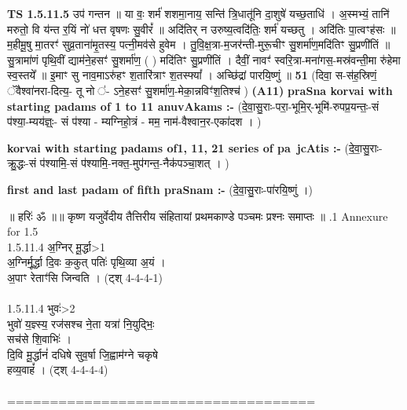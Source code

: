 \documentclass[17pt]{extarticle}
\begin{document}
                  \newline
                                \textbf{ TS 1.5.11.5} \newline
                  उप॑ गन्तन ॥ या वः॒ शर्म॑ शशमा॒नाय॒ सन्ति॑ त्रि॒धातू॑नि दा॒शुषे॑ यच्छ॒ताधि॑ । अ॒स्मभ्यं॒ तानि॑ मरुतो॒ वि य॑न्त र॒यिं नो॑ धत्त वृषणः सु॒वीरं᳚ ॥ अदि॑तिर् न उरुष्य॒त्वदि॑तिः॒ शर्म॑ यच्छतु । अदि॑तिः पा॒त्वꣳह॑सः ॥ म॒हीमू॒षु मा॒तरꣳ॑ सुव्र॒ताना॑मृ॒तस्य॒ पत्नी॒मव॑से हुवेम । तु॒वि॒क्ष॒त्रा-म॒जर॑न्ती-मुरू॒चीꣳ सु॒शर्मा॑ण॒मदि॑तिꣳ सु॒प्रणी॑तिं ॥ सु॒त्रामा॑णं पृथि॒वीं द्याम॑ने॒हसꣳ॑ सु॒शर्मा॑ण॒ ( ) मदि॑तिꣳ सु॒प्रणी॑तिं । दैवीं॒ नावꣳ॑ स्वरि॒त्रा-मना॑गस॒-मस्र॑वन्ती॒मा रु॑हेमा स्व॒स्तये᳚ ॥ इ॒माꣳ सु नाव॒माऽरु॑हꣳ श॒तारि॑त्राꣳ श॒तस्फ्यां᳚ । अच्छि॑द्रां पारयि॒ष्णुं ॥ \textbf{  51} \newline
                  \newline
                      (दिवा॒ स-स॑ह॒स्रिणं॒ ॅवैश्वा॑नरा-दित्य॒- तू नो ॑- ऽने॒हसꣳ॑ सु॒शर्मा॑ण॒-मेका॒न्नविꣳ॑श॒तिश्च॑ )  \textbf{(A11)} \newline \newline
                \textbf{praSna korvai with starting padams of 1 to 11 anuvAkams :-} \newline
        (दे॒वा॒सु॒राः-परा॒-भूमि॒र्-भूमि॑-रुपप्र॒यन्तः॒-सं प॑श्या॒-म्यय॑ज्ञ्ः॒- सं प॑श्या - म्यग्निहो॒त्रं - मम॒ नाम॑-वैश्वान॒र-एका॑दश । ) \newline

        \textbf{korvai with starting padams of1, 11, 21 series of pa~jcAtis :-} \newline
        (दे॒वा॒सु॒राः-क्रु॒द्धः-सं प॑श्यामि॒-सं प॑श्यामि॒-नक्त॒-मुप॑गन्त॒-नैक॑पञ्चा॒शत् । ) \newline

        \textbf{first and last padam of fifth praSnam :-} \newline
        (दे॒वा॒सु॒राः-पा॑रयि॒ष्णुं ।) \newline 

        
        ॥ हरिः॑ ॐ ॥॥ कृष्ण यजुर्वेदीय तैत्तिरीय संहितायां प्रथमकाण्डे पञ्चमः प्रश्नः समाप्तः ॥ \newline
        .1   Annexure for 1.5\\1.5.11.4 अ॒ग्निर् मू॒र्द्धा>1\\अ॒ग्निर्मू॒र्द्धा दि॒वः क॒कुत् पतिः॑ पृथि॒व्या अ॒यं ।\\अ॒पाꣳ रेताꣳ॑सि जिन्वति । (ट्श् 4-4-4-1)\\\\1.5.11.4 भुवः॑>2\\भुवो॑ य॒ज्ञ्स्य॒ रज॑सश्च ने॒ता यत्रा॑ नि॒युद्भिः॒ \\सच॑से शि॒वाभिः॑ ।\\दि॒वि मू॒र्द्धानं॑ दधिषे सुव॒र्षा जि॒ह्वाम॑ग्ने चकृषे \\हव्य॒वाहं᳚ । (ट्श् 4-4-4-4)\\\\====================================\\
                \pagebreak
        
\end{document}
